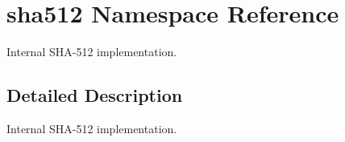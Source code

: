 \hypertarget{namespacesha512}{}\section{sha512 Namespace Reference}
\label{namespacesha512}


Internal S\+H\+A-\/512 implementation.  




\subsection{Detailed Description}
Internal S\+H\+A-\/512 implementation. 